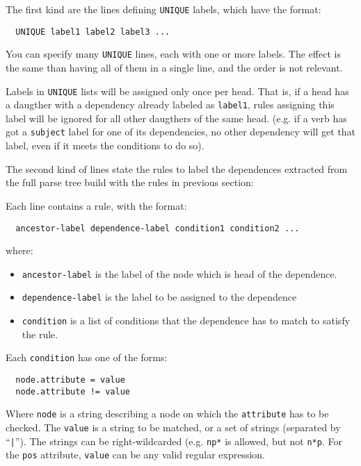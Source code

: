 \documentclass[a4paper]{book}
\begin{document}
  The first kind are the lines defining \verb#UNIQUE# labels, which
  have the format:
\begin{verbatim}
  UNIQUE label1 label2 label3 ...
\end{verbatim}

  You can specify many \verb#UNIQUE# lines, each with one or more
  labels. The effect is the same than having all of them in a single
  line, and the order is not relevant.

  Labels in \verb#UNIQUE# lists will be assigned only once per
  head. That is, if a head has a daugther with a dependency already
  labeled as \verb#label1#, rules assigning this label will be ignored
  for all other daugthers of the same head. (e.g. if a verb has got a
  \verb#subject# label for one of its dependencies, no other
  dependency will get that label, even if it meets the conditions to
  do so).

   The second kind of lines state the rules to label the
  dependences extracted from the full parse tree build with the
  rules in previous section:
  
  Each line contains a rule, with the format:
\begin{verbatim}
  ancestor-label dependence-label condition1 condition2 ...
\end{verbatim}

  where:
  \begin{itemize}
    \item  \verb#ancestor-label# is the label of the node which is
    head of the dependence.
    \item \verb#dependence-label# is the label to be assigned to the dependence
    \item \verb#condition# is a list of conditions that the dependence
    has to match to satisfy the rule.
  \end{itemize}

   Each \verb#condition# has one of the forms:
\begin{verbatim}
  node.attribute = value
  node.attribute != value
\end{verbatim}

   Where \verb#node# is a string describing a node on which the
   \verb#attribute# has to be checked.  The \verb#value# is a string
   to be matched, or a set of strings (separated by ``\verb#|#''). The
   strings can be right-wildcarded (e.g. \verb#np*# is allowed, but
   not \verb#n*p#. For the \verb#pos# attribute, \verb#value# can be
   any valid regular expression.
\end{document}
